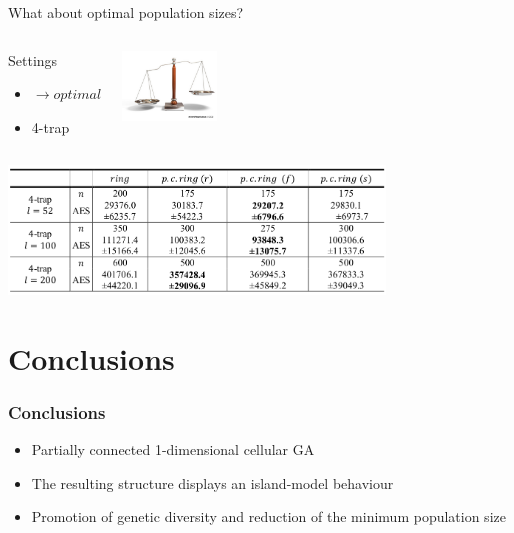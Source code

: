 \begin{frame}{What about optimal population sizes?}
\begin{columns}
\begin{scriptsize}
\begin{block}{Settings}
 \begin{itemize}
 \item {} $\rightarrow optimal$
 \item 4-trap 
 \end{itemize}
\end{block}
\end{scriptsize}
\includegraphics[width=2.5cm]{images/scale.png} 

\end{columns}
\centering
\includegraphics[width=10cm]{images/results3.png} 


\end{frame}



\section{Conclusions}

\begin{frame}
\frametitle{Conclusions}

\begin{itemize}
\item Partially connected 1-dimensional cellular GA
\item The resulting structure displays an island-model behaviour 
\item Promotion of genetic diversity and reduction of the minimum population size
\end{itemize}

\end{frame}
